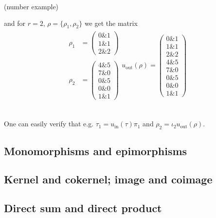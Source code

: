 \begin{example}{(number example)}
\begin{minipage}[t]{.5\textwidth}
\end{minipage}
\begin{minipage}[t]{.5\textwidth}
and for $r = 2$, $\rho = \{\rho_{1}, \rho_{2}\}$ we get the matrix
\begin{align*}
\begin{array}{rr}
\rho_{1} &= \begin{pmatrix}
0 \ampersand 1 \\
1 \ampersand 1 \\
2 \ampersand 2
\end{pmatrix} \\
\\
\rho_{2} &= \begin{pmatrix}
4 \ampersand 5 \\
7 \ampersand 0 \\
0 \ampersand 5 \\
0 \ampersand 0 \\
1 \ampersand 1
\end{pmatrix}
\end{array}
u_{\text{out}}(\rho) = \begin{pmatrix}
0 \ampersand 1 \\
1 \ampersand 1 \\
2 \ampersand 2 \\
4 \ampersand 5 \\
7 \ampersand 0 \\
0 \ampersand 5 \\
0 \ampersand 0 \\
1 \ampersand 1
\end{pmatrix}
\end{align*}
\end{minipage}\\

\noindent One can easily verify that e.g. $\tau_{1} = u_{\mathrm{in}}(\tau) \pi_{1}$ and $\rho_{2} = \iota_{2} u_{\mathrm{out}}(\rho)$.
\end{example}


\subsection{Monomorphisms and epimorphisms}

\subsection{Kernel and cokernel; image and coimage}

\subsection{Direct sum and direct product}